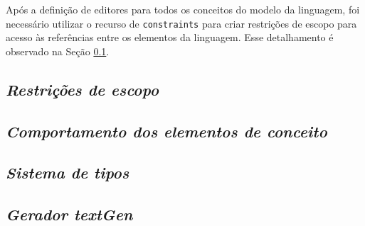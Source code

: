 



\newpage
Após a definição de editores para todos os conceitos do modelo da linguagem, foi necessário utilizar o recurso de \texttt{constraints} para criar restrições de escopo para acesso às referências entre os elementos da linguagem. Esse detalhamento é observado na Seção \ref{sub:sec:constraints}.

\newpage
\subsection{\textit{Restrições de escopo}}
\label{sub:sec:constraints}

\subsection{\textit{Comportamento dos elementos de conceito}}
\label{sub:sec:comportamentos}

\subsection{\textit{Sistema de tipos}}
\label{sub:sec:typesystem}

\subsection{\textit{Gerador textGen}}
\label{sub:sec:texgen}
